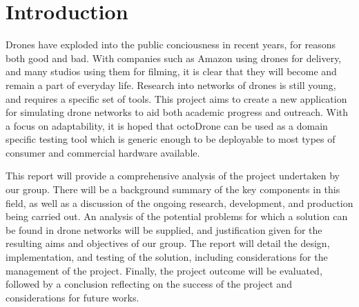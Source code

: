 \section{Introduction}
Drones have exploded into the public conciousness in recent years, for reasons both good and bad. With companies such as Amazon using drones for delivery, and many studios using them for filming, it is clear that they will become and remain a part of everyday life. Research into networks of drones is still young, and requires a specific set of tools. This project aims to create a new application for simulating drone networks to aid both academic progress and outreach. With a focus on adaptability, it is hoped that octoDrone can be used as a domain specific testing tool which is generic enough to be deployable to most types of consumer and commercial hardware available.

This report will provide a comprehensive analysis of the project undertaken by our group. There will be a background summary of the key components in this field, as well as a discussion of the ongoing research, development, and production being carried out. An analysis of the potential problems for which a solution can be found in drone networks will be supplied, and justification given for the resulting aims and objectives of our group. The report will detail the design, implementation, and testing of the solution, including considerations for the management of the project. Finally, the project outcome will be evaluated, followed by a conclusion reflecting on the success of the project and considerations for future works.
